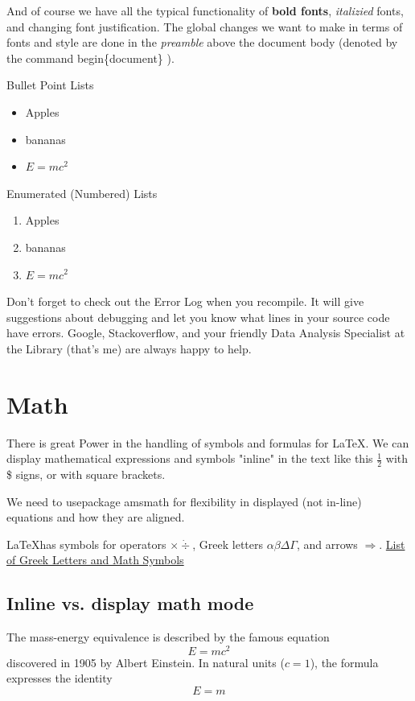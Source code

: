 \documentclass{article}
\begin{document}
And of course we have all the typical functionality of \textbf{bold fonts}, \textit{italizied} fonts, and changing font justification.  The global changes we want to make in terms of fonts and style are done in the \emph{preamble} above the document body (denoted by the command begin\{document\} ).

Bullet Point Lists
\begin{itemize}
    \item Apples
    \item bananas
    \item $E=mc^2$
\end{itemize}

Enumerated (Numbered) Lists
\begin{enumerate}
    \item Apples
    \item bananas
    \item $E=mc^2$
\end{enumerate}

Don't forget to check out the Error Log when you recompile.  It will give suggestions about debugging and let you know what lines in your source code have errors.  Google, Stackoverflow, and your friendly Data Analysis Specialist at the Library (that's me) are always happy to help.


\section{Math}  
There is great Power in the handling of symbols and formulas for LaTeX.  We can display mathematical expressions and symbols "inline" in the text like this $\frac{1}{2}$ with \$ signs, or with square brackets.

We need to usepackage amsmath for flexibility in displayed (not in-line) equations and how they are aligned.  

\LaTeX has symbols for operators $\times \dot \div$, Greek letters $\alpha \beta \Delta \Gamma$, and arrows $\Rightarrow$.
\href{https://www.overleaf.com/learn/latex/List_of_Greek_letters_and_math_symbols}{List of Greek Letters and Math Symbols}


\subsection{Inline vs. display math mode}
The mass-energy equivalence is described by the famous equation \[ E=mc^2 \]
discovered in 1905 by Albert Einstein. 
In natural units ($c = 1$), the formula expresses the identity
\begin{equation}
E=m
\end{equation}
\end{document}
